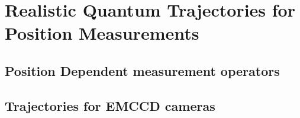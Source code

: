 \chapter{Realistic Quantum Trajectories for Position Measurements}

      \section{Position Dependent measurement operators}
      \section{Trajectories for EMCCD cameras}

